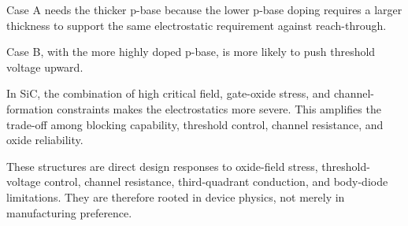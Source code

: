 \begin{solutionblock}
Case A needs the thicker p-base because the lower p-base doping requires a larger thickness to support the same electrostatic requirement against reach-through.
\end{solutionblock}

\begin{solutionblock}
Case B, with the more highly doped p-base, is more likely to push threshold voltage upward.
\end{solutionblock}

\begin{solutionblock}
In SiC, the combination of high critical field, gate-oxide stress, and channel-formation constraints makes the electrostatics more severe. This amplifies the trade-off among blocking capability, threshold control, channel resistance, and oxide reliability.
\end{solutionblock}

\begin{solutionblock}
These structures are direct design responses to oxide-field stress, threshold-voltage control, channel resistance, third-quadrant conduction, and body-diode limitations. They are therefore rooted in device physics, not merely in manufacturing preference.
\end{solutionblock}




